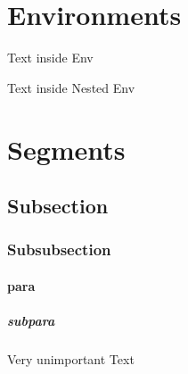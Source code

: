 \section{Environments}
\begin{Some_Env}
Text inside Env

\begin{Nested_Env}
Text inside Nested Env

\end{Nested_Env}
\end{Some_Env}
\section{Segments}
\subsection{Subsection}
\subsubsection{Subsubsection}
\paragraph{para}
\subparagraph{subpara}
Very unimportant Text



